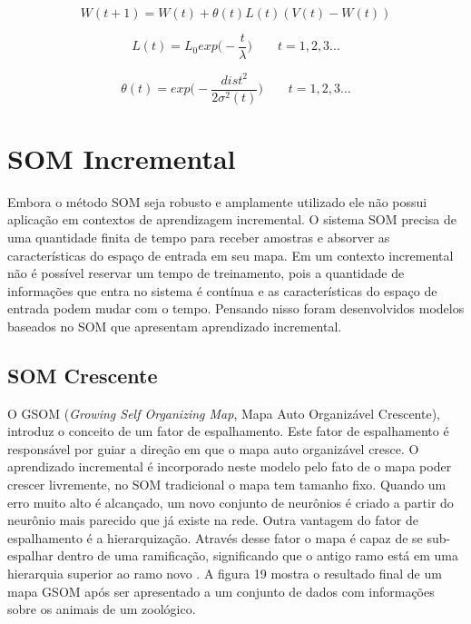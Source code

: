 \begin{equation}
W(t + 1) = W(t) +   \theta (t) L(t) (V(t) - W(t))
\end{equation}


\begin{equation}
L(t) =  L_{0} exp  \big( - \frac{t}{ \lambda } \big) \quad \quad t = 1,2,3...
\end{equation}

\begin{equation} 
\theta (t) = exp  \big(- \frac{ dist^{2} }{2  \sigma^{2}(t) } \big)  \quad \quad t= 1,2,3...
\end{equation}

\section{SOM Incremental}
Embora o método SOM seja robusto e amplamente utilizado ele não possui aplicação em contextos de aprendizagem incremental. O sistema SOM precisa de uma quantidade finita de tempo para receber amostras e absorver as características do espaço de entrada em seu mapa. Em um contexto incremental não é possível reservar um tempo de treinamento, pois a quantidade de informações que entra no sistema é contínua e as características do espaço de entrada podem mudar com o tempo. Pensando nisso foram desenvolvidos modelos baseados no SOM que apresentam aprendizado incremental.

\subsection{SOM Crescente}
O GSOM (\textit{Growing Self Organizing Map}, Mapa Auto Organizável Crescente), introduz o conceito de um fator de espalhamento. Este fator de espalhamento é responsável por guiar a direção em que o mapa auto organizável cresce. O aprendizado incremental é incorporado neste modelo pelo fato de o mapa poder crescer livremente, no SOM tradicional o mapa tem tamanho fixo. Quando um erro muito alto é alcançado, um novo conjunto de neurônios é criado a partir do neurônio mais parecido que já existe na rede. Outra vantagem do fator de espalhamento é a hierarquização. Através desse fator o mapa é capaz de se sub-espalhar dentro de uma ramificação, significando que o antigo ramo está em uma hierarquia superior ao ramo novo \cite{gsom2000}. A figura 19 mostra o resultado final de um mapa GSOM após ser apresentado a um conjunto de dados com informações sobre os animais de um zoológico.

